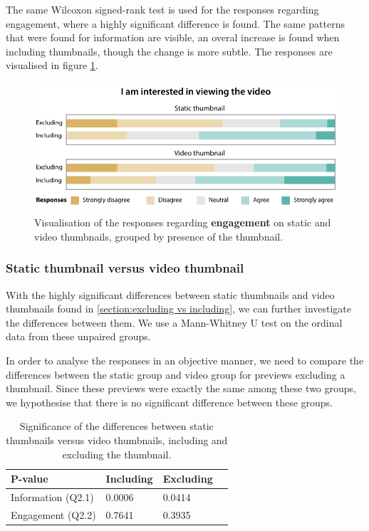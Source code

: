 \documentclass{../resources/sig-alternate-05-2015}
\begin{document}
The same Wilcoxon signed-rank test is used for the responses regarding engagement, where a highly significant difference is found. The same patterns that were found for information are visible, an overal increase is found when including thumbnails, though the change is more subtle. The responses are visualised in figure \ref{figure:engagement including excluding}.

\begin{figure}[h!]
	\includegraphics[width=\linewidth]{resources/engagement_including_excluding}
	\caption{Visualisation of the responses regarding \textbf{engagement} on static and video thumbnails, grouped by presence of the thumbnail.}
	\label{figure:engagement including excluding}
\end{figure}

\subsubsection{Static thumbnail versus video thumbnail}
\label{section: static versus video}

With the highly significant differences between static thumbnails and video thumbnails found in \ref{section:excluding vs including}, we can further investigate the differences between them. We use a Mann-Whitney U test on the ordinal data from these unpaired groups.

In order to analyse the responses in an objective manner, we need to compare the differences between the static group and video group for previews excluding a thumbnail. Since these previews were exactly the same among these two groups, we hypothesise that there is no significant difference between these groups.

\begin{table}[h]
\centering
\begin{tabular}{@{}llll@{}}
\textbf{P-value}   & \textbf{Including} & \textbf{Excluding} \\ \hline
Information (Q2.1) & 0.0006             & 0.0414             \\
Engagement (Q2.2)  & 0.7641             & 0.3935
\end{tabular}
\caption{Significance of the differences between static thumbnails versus video thumbnails, including and excluding the thumbnail.}
\label{table: q2 significance}
\end{table}
\end{document}
